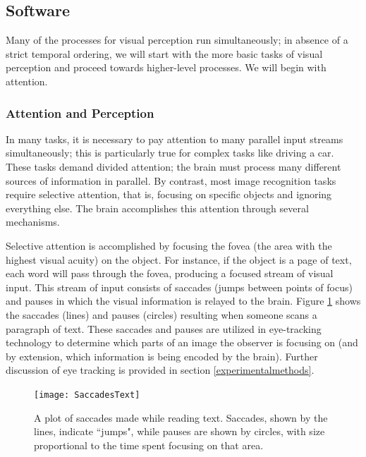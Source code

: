 \documentclass[11pt]{isuthesis}\usepackage[]{graphicx}\usepackage[]{color}
\begin{document}
\subsection{Software}\label{Software}
Many of the processes for visual perception run simultaneously; in absence of a strict temporal ordering, we will start with the more basic tasks of visual perception and proceed towards higher-level processes. We will begin with attention.

\subsubsection{Attention and Perception} \label{AttentionPerception}
In many tasks, it is necessary to pay attention to many parallel input streams simultaneously; this is particularly true for complex tasks like driving a car. These tasks demand divided attention; the brain must process many different sources of information in parallel. By contrast, most image recognition tasks require selective attention, that is, focusing on specific objects and ignoring everything else. The brain accomplishes this attention through several mechanisms. 

Selective attention is accomplished by focusing the fovea (the area with the highest visual acuity) on the object. For instance, if the object is a page of text, each word will pass through the fovea, producing a focused stream of visual input. This stream of input consists of saccades (jumps between points of focus) and pauses in which the visual information is relayed to the brain. Figure \ref{fig:saccadestext} shows the saccades (lines) and pauses (circles) resulting when someone scans a paragraph of text. These saccades and pauses are utilized in eye-tracking technology to determine which parts of an image the observer is focusing on (and by extension, which information is being encoded by the brain). Further discussion of eye tracking is provided in section \ref{experimentalmethods}. 

\begin{figure}[htbp]
\centering
\texttt{[image: SaccadesText]}
\caption[Saccades and Pauses]{A plot of saccades made while reading text. Saccades, shown by the lines, indicate ``jumps", while pauses are shown by circles, with size proportional to the time spent focusing on that area.}\label{fig:saccadestext}
\end{figure}
\end{document}

